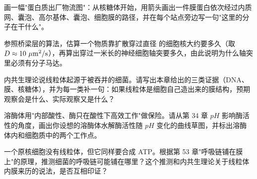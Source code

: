 \begin{sikaoti}
\item 画一幅"蛋白质出厂物流图"：从核糖体开始，用箭头画出一件膜蛋白依次经过内质网、囊泡、高尔基体、囊泡、细胞膜的路径，并在每个站点旁边写一句"这里的分子在干什么"。
\item 参照桥梁层的算法，估算一个物质靠扩散穿过直径  的细胞核大约要多久（取 $D\approx10\ \mathrm{\mu m^2/s}$），再算出穿过一米长的神经细胞轴突要多久，由此说明为什么轴突里必须有分子马达。
\item 内共生理论说线粒体起源于被吞并的细菌。请写出本章给出的三类证据（DNA、膜、核糖体），并为每一类补一句：如果线粒体是细胞自己造出来的膜结构，预期观察会是什么、实际观察又是什么？
\item 溶酶体用"内部酸性、酶只在酸性下高效工作"做保险。请从第 34 章 $pH$ 影响酶活性的角度，画出你设想的溶酶体水解酶活性随 $pH$ 变化的曲线草图，并标出溶酶体内和细胞质中的两个工作点。
\item 一个原核细胞没有线粒体，但它同样要合成 ATP。根据第 53 章"呼吸链铺在膜上"的原理，推测细菌的呼吸链可能铺在哪里？这个推测和内共生理论关于线粒体内膜来历的说法，是否互相印证？
\end{sikaoti}
